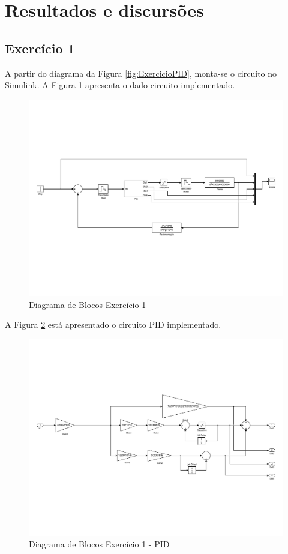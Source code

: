\section{Resultados e discursões}

\subsection{Exercício 1}

	A partir do diagrama da Figura \ref{fig:ExercicioPID}, monta-se o circuito no Simulink\textregistered. A Figura \ref{fig:Exercicio1_PID_SimulinkII} apresenta o dado circuito implementado.

	\begin{figure}[!th]
		\centering
		\includegraphics[scale = .3]{Imagens/Exercicio1_PID_SimulinkII.pdf}
		\caption{Diagrama de Blocos Exercício 1}
		\label{fig:Exercicio1_PID_SimulinkII}
	\end{figure}
	
	 A Figura \ref{fig:Exercicio1_PID_Simulink} está apresentado o circuito PID implementado. 
	
	\begin{figure}[!th]
		\centering
		\includegraphics[scale = .3]{Imagens/Exercicio1_PID_Simulink.pdf}
		\caption{Diagrama de Blocos Exercício 1 - PID}
		\label{fig:Exercicio1_PID_Simulink}
	\end{figure}